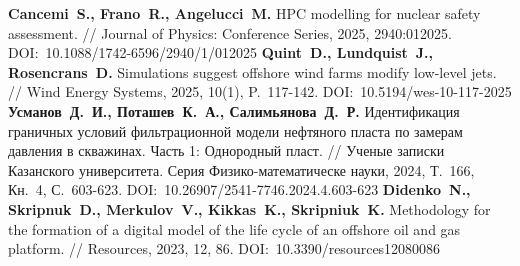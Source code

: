 \begin{thebibliography}{99}
\textbf{Cancemi~S., Frano~R., Angelucci~M.} HPC modelling for nuclear safety assessment. // Journal of Physics: Conference Series, 2025, 2940:012025. DOI:~10.1088/1742-6596/2940/1/012025
\textbf{Quint~D., Lundquist~J., Rosencrans~D.} Simulations suggest offshore wind farms modify low-level jets. // Wind Energy Systems, 2025, 10(1), P.~117-142. DOI:~10.5194/wes-10-117-2025
\textbf{Усманов~Д.~И., Поташев~К.~А., Салимьянова~Д.~Р.} Идентификация граничных условий фильтрационной модели нефтяного пласта по замерам давления в скважинах. Часть 1: Однородный пласт. // Ученые записки Казанского университета. Серия Физико-математическе науки, 2024, Т.~166, Кн.~4, С.~603-623. DOI:~10.26907/2541-7746.2024.4.603-623
\textbf{Didenko~N., Skripnuk~D., Merkulov~V., Kikkas~K., Skripniuk~K.} Methodology for the formation of a digital model of the life cycle of an offshore oil and gas platform. // Resources, 2023, 12, 86. DOI:~10.3390/resources12080086


\end{thebibliography}
